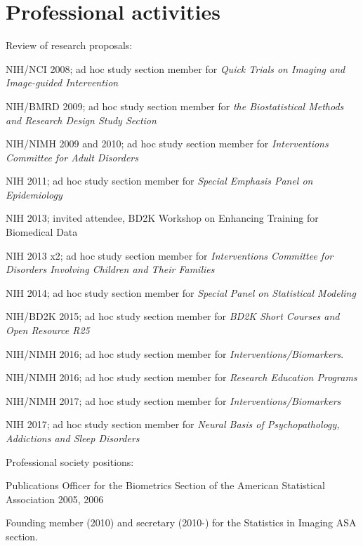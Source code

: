 \documentclass[12pt]{article}
\begin{document}
\section*{Professional activities}
\begin{description}{}{}
\item Review of research proposals:
  \begin{description}
  \item NIH/NCI  2008; ad hoc study section member for {\it Quick Trials on Imaging and Image-guided Intervention}
  \item NIH/BMRD 2009; ad hoc study section member for {\it the Biostatistical Methods and Research Design Study Section}
  \item NIH/NIMH 2009 and 2010; ad hoc study section member for {\it Interventions Committee for Adult Disorders}
  \item NIH      2011; ad hoc study section member for {\it Special Emphasis Panel on Epidemiology} 
  \item NIH      2013; invited attendee, BD2K Workshop on Enhancing Training for Biomedical Data
  \item NIH		 2013 x2; ad hoc study section member for {\it Interventions Committee for Disorders Involving Children and Their Families}
  \item NIH 2014; ad hoc study section member for {\it Special Panel on Statistical Modeling}
  \item NIH/BD2K 2015; ad hoc study section member for {\it  BD2K Short Courses and Open Resource R25}
  \item NIH/NIMH 2016; ad hoc study section member for {\it Interventions/Biomarkers}.
  \item NIH/NIMH 2016; ad hoc study section member for {\it Research Education Programs}
    \item NIH/NIMH 2017; ad hoc study section member for {\it Interventions/Biomarkers}
  \item NIH 2017; ad hoc study section member for {\it Neural Basis of Psychopathology, Addictions and Sleep Disorders}
  \end{description}
\item Professional society positions:
\begin{description}
\item Publications Officer for the Biometrics Section of the American Statistical Association 2005, 2006
\item Founding member (2010) and secretary (2010-) for the Statistics in Imaging ASA section.

\end{description}
\end{description}
\end{document}
